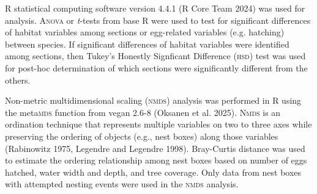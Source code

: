R statistical computing software version 4.4.1 (R Core Team 2024) was used for analysis. A\textsc{nova} or \textit{t}-tests from base R were used to test for significant differences of habitat variables among sections or egg-related variables (e.g. hatching) between species. If significant differences of habitat variables were identified among sections, then Tukey's Honestly Signficant Difference (\textsc{hsd}) test was used  for post-hoc determination of which sections were significantly different from the others. 


Non-metric multidimensional scaling \textsc{(nmds)} analysis was performed in R using the meta\textsc{mds} function from vegan 2.6-8 (Oksanen et al. 2025). N\textsc{mds} is an ordination technique that represents multiple variables on two to three axes while preserving the ordering of objects (e.g., nest boxes) along those variables (Rabinowitz 1975, Legendre and Legendre 1998). Bray-Curtis distance was used to estimate the ordering relationship among nest boxes based on number of eggs hatched, water width and depth, and tree coverage. Only data from nest boxes with attempted nesting events were used in the \textsc{nmds} analysis. 


